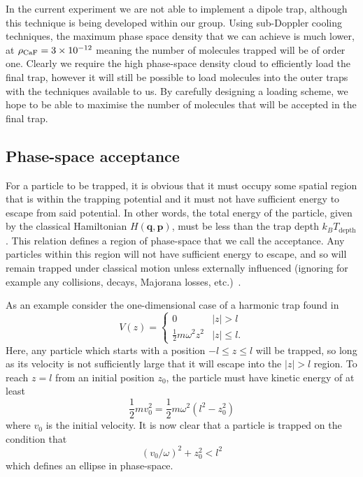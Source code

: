 In the current experiment we are not able to implement a dipole trap, although
this technique is being developed within our group. Using sub-Doppler cooling
techniques, the maximum phase
space density that we can achieve is much lower, at $\rho_\text{CaF{}} =
3\times10^{-12}$ meaning the number of molecules trapped will be of order one.
Clearly we require the high phase-space density cloud to efficiently load the
final trap, however it will still be possible to load molecules into the outer
traps with the techniques available to us. By carefully designing a loading
scheme, we hope to be able to maximise the number of molecules that will be
accepted in the final trap.


\subsection{Phase-space acceptance}

For a particle to be trapped, it is obvious that it must occupy some spatial
region that is within the trapping potential and it must not have sufficient
energy to escape from said potential. In other words, the total energy of the
particle, given by the classical Hamiltonian $H(\mathbf{q}, \mathbf{p})$, must
be less than the trap depth $k_B T_\text{depth}$.  This relation defines a region
of phase-space that we call the acceptance. Any particles within this region
will not have sufficient energy to escape, and so will remain trapped under
classical motion unless externally influenced (ignoring for example any
collisions, decays, Majorana losses, etc.)~\cite{Lichtenberg1969}.

As an example consider the one-dimensional case of a harmonic trap found in 
%
\begin{equation}
  V(z) = \begin{cases}
    0 & |z| > l \\
    \frac{1}{2}m\omega^2 z^2 & |z| \leq l.
  \end{cases}
\end{equation}
%
Here, any particle which starts with a position $-l \leq z \leq l$ will be
trapped, so long as its velocity is not sufficiently large that it will escape
into the $|z|> l$ region. To reach $z=l$ from an initial position $z_0$, the
particle must have kinetic energy of at least
%
\begin{equation}
  \frac{1}{2}mv_0^2 = \frac{1}{2}m\omega^2(l^2 - z_0^2)
\end{equation}
%
where $v_0$ is the initial velocity. It is now clear that a particle is trapped
on the condition that
%
\begin{equation}
  (v_0/\omega)^2 + z_0^2 < l^2
\end{equation}
%
which defines an ellipse in phase-space.

